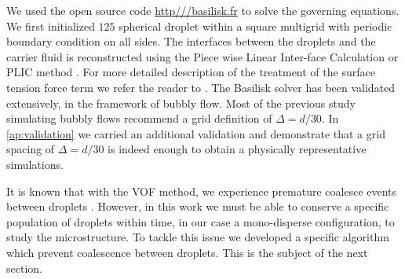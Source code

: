 We used the open source code \url{http///basilisk.fr} to solve the governing equations. 
We first initialized $125$ spherical droplet within a square multigrid with periodic boundary condition on all sides. 
The interfaces between the droplets and the carrier fluid is reconstructed using the Piece wise Linear Inter-face Calculation or PLIC method \citet[Chapter 5.]{tryggvason2011direct}.
For more detailed description of the treatment of the surface tension force term we refer the reader to \citet{popinet2018numerical}. 
The Basilisk solver has been validated extensively, in the framework of bubbly flow. 
Most of the previous study\citep{hidman2023assessing,innocenti2020direct} simulating bubbly flows recommend a grid definition of $\Delta = d/30$. 
In \ref{ap:validation} we carried an additional validation and demonstrate that a grid spacing of $\Delta = d/30$ is indeed enough to obtain a physically representative simulations.

It is known that with the VOF method, we experience premature coalesce events between droplets \citet[Appendix B]{innocenti2020direct}.
However, in this work we must be able to conserve a specific population of droplets within time, in our case a mono-disperse configuration, to study the microstructure. 
To tackle this issue we developed a specific algorithm which prevent coalescence between droplets. 
This is the subject of the next section. 





